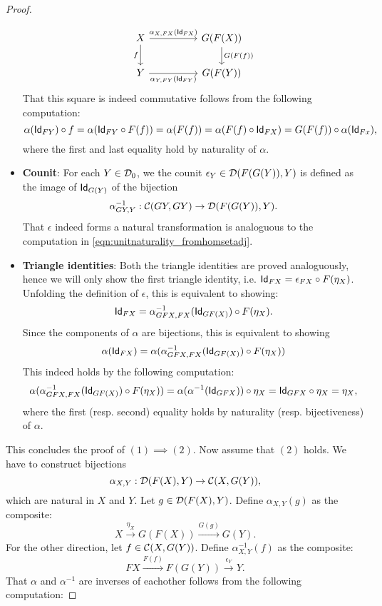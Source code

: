 \begin{thm}
\begin{proof}
\begin{itemize}
\[
\begin{tikzcd}
X \arrow[rr, "{\alpha_{X,FX}(\Id[FX])}"] \arrow[d,swap, "f"] && G(F(X)) \arrow[d, "G(F(f))"] \\
Y \arrow[rr, swap, "{\alpha_{Y,FY}(\Id[FY])}"] && G(F(Y))
\end{tikzcd}
\]
That this square is indeed commutative follows from the following computation:
\begin{equation}\label{eqn:unitnaturality_fromhomsetadj}
\co{f}{\alpha(\Id[FY])} = \alpha(\co{F(f)}{\Id[FY]}) = \alpha(F(f)) =  \alpha(\co{\Id[FX]}{F(f)}) = \co{\alpha(\Id[Fx])}{G(F(f))},
\end{equation}
where the first and last equality hold by naturality of $\alpha$.
\item \textbf{Counit}: For each $Y\in\Ob{\DD}$, we the counit $\epsilon_Y \in \CHom{\DD}{F(G(Y))}{Y}$ is defined as the image of $\Id[G(Y)]$ of the bijection
\[
\alpha^{-1}_{GY,Y} : \CHom{\CC}{GY}{GY}\to \CHom{\DD}{F(G(Y))}{Y}.
\]
That $\epsilon$ indeed forms a natural transformation is analoguous to the computation in \cref{eqn:unitnaturality_fromhomsetadj}.
\item \textbf{Triangle identities}: Both the triangle identities are proved analoguously, hence we will only show the first triangle identity, i.e. $\Id[FX] = \co{F(\eta_X)}{\epsilon_{FX}}$. Unfolding the definition of $\epsilon$, this is equivalent to showing:
\[
\Id[FX] = \co{F(\eta_X)}{\alpha^{-1}_{GFX,FX}(\Id[GF(X)])}.
\]
Since the components of $\alpha$ are bijections, this is equivalent to showing 
\[
\alpha(\Id[FX]) = \alpha(\co{F(\eta_X)}{\alpha^{-1}_{GFX,FX}(\Id[GF(X)])})
\]
This indeed holds by the following computation:
\[
\alpha(\co{F(\eta_X)}{\alpha^{-1}_{GFX,FX}(\Id[GF(X)])}) = \co{\eta_X}{\alpha(\alpha^{-1}(\Id[GFX]))} = \co{\eta_X}{\Id[GFX]} = \eta_X,
\]
where the first (resp. second) equality holds by naturality (resp. bijectiveness) of $\alpha$.
\end{itemize}
This concludes the proof of $(1)\implies (2)$. Now assume that $(2)$ holds. We have to construct bijections
\[
\alpha_{X,Y} : \CHom{\DD}{F(X)}{Y} \to \CHom{\CC}{X}{G(Y)},
\]
which are natural in $X$ and $Y$. Let $g\in \CHom{\DD}{F(X)}{Y}$. Define $\alpha_{X,Y}(g)$ as the composite:
\[
X \xrightarrow{\eta_X} G(F(X)) \xrightarrow{G(g)} G(Y).
\]
For the other direction, let $f\in \CHom{\CC}{X}{G(Y)}$. Define $\alpha^{-1}_{X,Y}(f)$ as the composite:
\[
FX \xrightarrow{F(f)} F(G(Y)) \xrightarrow{\epsilon_Y} Y.
\]
That $\alpha$ and $\alpha^{-1}$ are inverses of eachother follows from the following computation:

\end{proof}
\end{thm}
